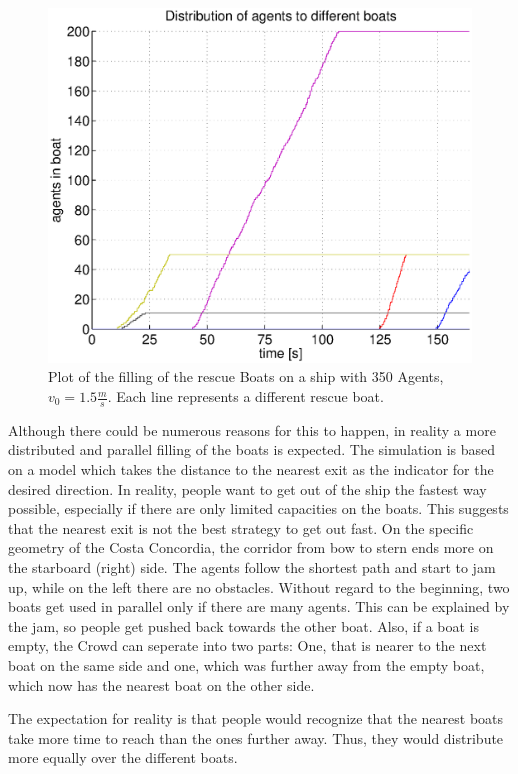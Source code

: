 \documentclass[11pt]{article}
\begin{document}
\begin{figure}[h]
	\centering
	\includegraphics[scale=0.5]{images/distribution33.eps}
	\caption{Plot of the filling of the rescue Boats on a ship with 350 Agents, \(v_0=1.5\frac{m}{s}\).
	Each line represents a different rescue boat.}
	\label{distribution33}
\end{figure}

Although there could be numerous
reasons for this to happen, in reality a more distributed and parallel filling
of the boats is expected.  The simulation is based on a model which takes the
distance to the nearest exit as the indicator for the desired direction.  In
reality, people want to get out of the ship the fastest way possible,
especially if there are only limited capacities on the boats.  This suggests
that the nearest exit is not the best strategy to get out fast.  On the
specific geometry of the Costa Concordia, the corridor from bow to stern ends
more on the starboard (right) side.  The agents follow the shortest path and
start to jam up, while on the left there are no obstacles.
Without regard to the beginning, two boats get used in parallel only if there are many agents.
This can be explained by the jam, so people get pushed back towards the other 
boat. Also, if a boat is empty, the Crowd can seperate into two parts: One,
that is nearer to the next boat on the same side and one, which was further
away from the empty boat, which now has the nearest boat on the other side.

The expectation for reality is that people would recognize that the nearest 
boats take more time to reach than the ones further away. Thus, they would 
distribute more equally over the different boats.
\end{document}
